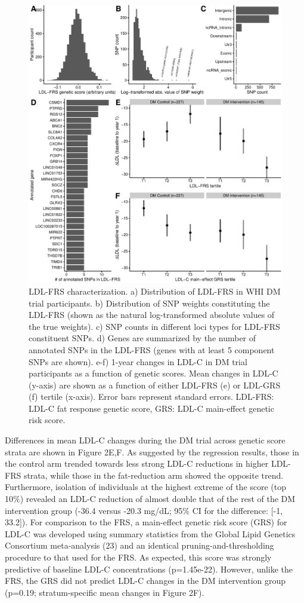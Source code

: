 \documentclass[]{article}
\begin{document}
\begin{figure}
\centering
\includegraphics{figures/ldl-score-characterization-1.pdf}
\caption{LDL-FRS characterization. a) Distribution of LDL-FRS in WHI DM
trial participants. b) Distribution of SNP weights constituting the
LDL-FRS (shown as the natural log-transformed absolute values of the
true weights). c) SNP counts in different loci types for LDL-FRS
constituent SNPs. d) Genes are summarized by the number of annotated
SNPs in the LDL-FRS (genes with at least 5 component SNPs are shown).
e-f) 1-year changes in LDL-C in DM trial participants as a function of
genetic scores. Mean changes in LDL-C (y-axis) are shown as a function
of either LDL-FRS (e) or LDL-GRS (f) tertile (x-axis). Error bars
represent standard errors. LDL-FRS: LDL-C fat response genetic score,
GRS: LDL-C main-effect genetic risk score.}
\end{figure}

Differences in mean LDL-C changes during the DM trial across genetic
score strata are shown in Figure 2E,F. As suggested by the regression
results, those in the control arm trended towards less strong LDL-C
reductions in higher LDL-FRS strata, while those in the fat-reduction
arm showed the opposite trend. Furthermore, isolation of individuals at
the highest extreme of the score (top 10\%) revealed an LDL-C reduction
of almost double that of the rest of the DM intervention group (-36.4
versus -20.3 mg/dL; 95\% CI for the difference: {[}-1, 33.2{]}). For
comparison to the FRS, a main-effect genetic risk score (GRS) for LDL-C
was developed using summary statistics from the Global Lipid Genetics
Consortium meta-analysis (23) and an identical pruning-and-thresholding
procedure to that used for the FRS. As expected, this score was strongly
predictive of baseline LDL-C concentrations (p=1.45e-22). However,
unlike the FRS, the GRS did not predict LDL-C changes in the DM
intervention group (p=0.19; stratum-specific mean changes in Figure 2F).
\end{document}
